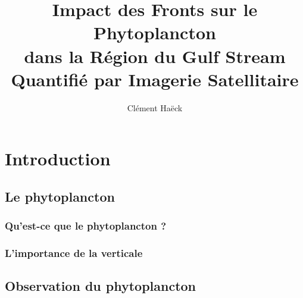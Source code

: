 
\usepackage{soutenance}


\title{%
  Impact des Fronts sur le Phytoplancton\\
  dans la Région du Gulf Stream\\
  Quantifié par Imagerie Satellitaire
}

\author{Clément Haëck}





{
  \begin{frame}
    \titlepage%
  \end{frame}
}

\section{Introduction}
\subsection{Le phytoplancton}


\begin{frame}
  \frametitle{Qu'est-ce que le phytoplancton ?}
  {
    \centering
  }
\end{frame}


\begin{frame}
  \frametitle{L'importance de la verticale}
  {
    \centering
  }

\end{frame}


\subsection{Observation du phytoplancton}

